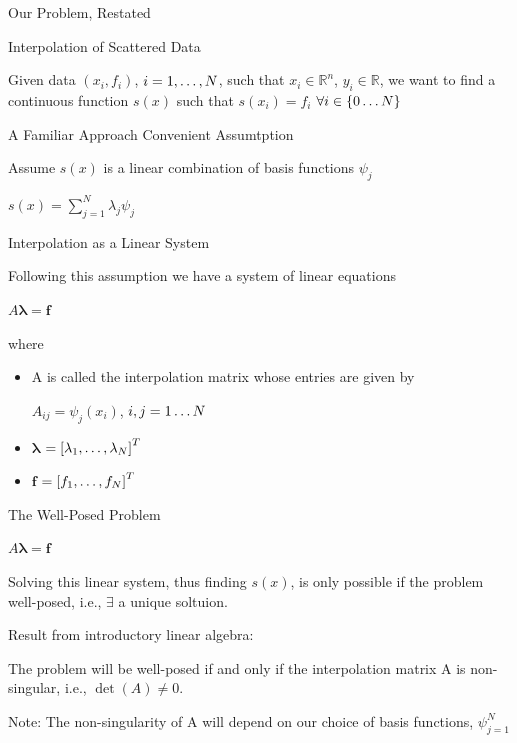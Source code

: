 \documentclass[12pt,t]{beamer}
\newcommand{\bi}{\begin{itemize}}
\newcommand{\ei}{\end{itemize}}
\newcommand{\subt}[1]{{\footnotesize \color{subtitle} {#1}}}
\begin{document}
\begin{frame}[c]{Our Problem, Restated}

\subt{Interpolation of Scattered Data}

Given data $(x_i,f_i)$, $i=1, \mathellipsis, N$, such that $x_i \in \mathbb{R}^n$, $y_i \in \mathbb{R}$, we want to find a continuous function $s(x)$ such that $s(x_i)=f_i$ $\forall i\in\{0 \mathellipsis N \}$


\note{}
\end{frame}

\begin{frame}{A Familiar Approach}
\subt{Convenient Assumtption}

Assume $s(x)$ is a linear combination of \subt{basis functions} $\psi_j$
\begin{center}
$s(x)=\sum_{j=1}^N \lambda_j \psi_j$
\end{center}

\subt{Interpolation as a Linear System}

Following this assumption we have a system of linear equations
\begin{center}
$A\boldsymbol{\lambda}=\boldsymbol{f}$
\end{center}
 where
 \bi
\item[A] is called the \subt{interpolation matrix} whose entries are given by\\
\begin{center}
$A_{ij}=\psi_j(x_i)$, $i,j= 1 \mathellipsis N$
\end{center}
\item[$\boldsymbol{\lambda}$] $=\left[ \lambda_1, \mathellipsis, \lambda_N \right]^T$
\item[$\boldsymbol{f}$] $=\left[ f_1, \mathellipsis, f_N \right]^T$
\ei

\note{}
\end{frame}

\begin{frame}{The Well-Posed Problem}
\begin{center}
$A\boldsymbol{\lambda}=\boldsymbol{f}$
\end{center}

Solving this linear system, thus finding $s(x)$, is only possible if the problem \subt{well-posed}, i.e., $\exists$ a unique soltuion. 
\bigskip

\subt{Result from introductory linear algebra:} 

The problem will be well-posed if and only if the interpolation matrix A is \subt{non-singular}, i.e., $\det(A)\neq0$.
\bigskip

\subt{Note:} The non-singularity of A will depend on our choice of basis functions, $\psi_{j=1}^N$

\end{frame}
\end{document}
